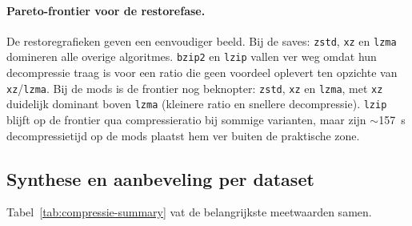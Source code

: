 \paragraph{Pareto-frontier voor de restorefase.}
De restoregrafieken geven een eenvoudiger beeld. Bij de saves: \texttt{zstd}, \texttt{xz} en \texttt{lzma} domineren alle overige algoritmes. \texttt{bzip2} en \texttt{lzip} vallen ver weg omdat hun decompressie traag is voor een ratio die geen voordeel oplevert ten opzichte van \texttt{xz}/\texttt{lzma}. Bij de mods is de frontier nog beknopter: \texttt{zstd}, \texttt{xz} en \texttt{lzma}, met \texttt{xz} duidelijk dominant boven \texttt{lzma} (kleinere ratio en snellere decompressie). \texttt{lzip} blijft op de frontier qua compressieratio bij sommige varianten, maar zijn $\sim$157~s decompressietijd op de mods plaatst hem ver buiten de praktische zone.

\subsection{Synthese en aanbeveling per dataset}
\label{subsec:compressie-conclusie}

Tabel~\ref{tab:compressie-summary} vat de belangrijkste meetwaarden
samen.

